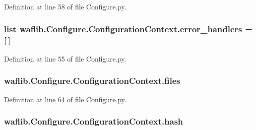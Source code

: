 Definition at line 58 of file Configure.\+py.

\subsubsection[{\texorpdfstring{error\+\_\+handlers}{error_handlers}}]{\setlength{\rightskip}{0pt plus 5cm}list waflib.\+Configure.\+Configuration\+Context.\+error\+\_\+handlers = \mbox{[}$\,$\mbox{]}\hspace{0.3cm}{\ttfamily [static]}}\hypertarget{classwaflib_1_1_configure_1_1_configuration_context_a0ec0990e6432000e2027c3a0a70123d8}{}\label{classwaflib_1_1_configure_1_1_configuration_context_a0ec0990e6432000e2027c3a0a70123d8}


Definition at line 55 of file Configure.\+py.

\subsubsection[{\texorpdfstring{files}{files}}]{\setlength{\rightskip}{0pt plus 5cm}waflib.\+Configure.\+Configuration\+Context.\+files}\hypertarget{classwaflib_1_1_configure_1_1_configuration_context_ae982f3ec2796181cda27d70b375be394}{}\label{classwaflib_1_1_configure_1_1_configuration_context_ae982f3ec2796181cda27d70b375be394}


Definition at line 64 of file Configure.\+py.

\subsubsection[{\texorpdfstring{hash}{hash}}]{\setlength{\rightskip}{0pt plus 5cm}waflib.\+Configure.\+Configuration\+Context.\+hash}\hypertarget{classwaflib_1_1_configure_1_1_configuration_context_a45c2f2e7ddb2faef9587d460b90c1689}{}\label{classwaflib_1_1_configure_1_1_configuration_context_a45c2f2e7ddb2faef9587d460b90c1689}


